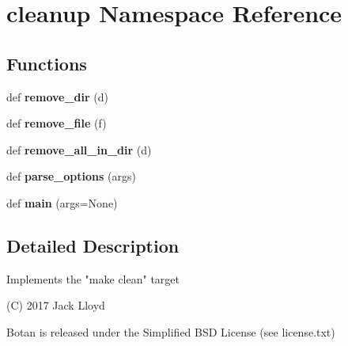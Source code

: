 \hypertarget{namespacecleanup}{}\section{cleanup Namespace Reference}
\label{namespacecleanup}
\subsection*{Functions}
\begin{DoxyCompactItemize}
\item 
\mbox{\label{namespacecleanup_a1baf3c6b1790abaada2e5f0652a7040a}} 
def {\bfseries remove\+\_\+dir} (d)
\item 
\mbox{\label{namespacecleanup_ae445167f0a1792fbe92b7da4f92b1a05}} 
def {\bfseries remove\+\_\+file} (f)
\item 
\mbox{\label{namespacecleanup_a81b43db1ccf4fb994e7025d99b394cdb}} 
def {\bfseries remove\+\_\+all\+\_\+in\+\_\+dir} (d)
\item 
\mbox{\label{namespacecleanup_a066f3160149f15522237004ac223e4c2}} 
def {\bfseries parse\+\_\+options} (args)
\item 
\mbox{\label{namespacecleanup_ac3400970795cc33aa0efe6a5fbe96624}} 
def {\bfseries main} (args=None)
\end{DoxyCompactItemize}


\subsection{Detailed Description}
\begin{DoxyVerb}Implements the "make clean" target

(C) 2017 Jack Lloyd

Botan is released under the Simplified BSD License (see license.txt)
\end{DoxyVerb}
 